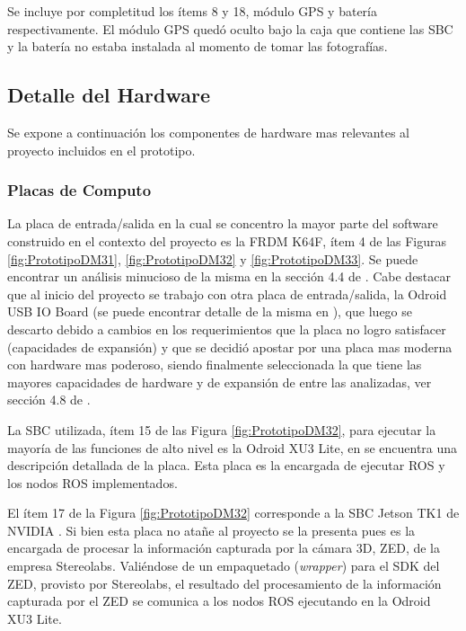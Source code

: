 \documentclass[withindex,glossary]{cam-thesis}
\begin{document}
Se incluye por completitud los ítems 8 y 18, módulo GPS y batería respectivamente. El módulo GPS quedó oculto bajo la caja que contiene las SBC y la batería no estaba instalada al momento de tomar las fotografías.

\subsection{Detalle del Hardware} \label{sec: Implementación :: Plataforma Utilizada - Hardware}
Se expone a continuación los componentes de hardware mas relevantes al proyecto incluidos en el prototipo.

\subsubsection{Placas de Computo} 
La placa de entrada/salida en la cual se concentro la mayor parte del software construido en el contexto del proyecto es la FRDM K64F, ítem 4 de las Figuras \ref{fig:PrototipoDM31}, \ref{fig:PrototipoDM32} y \ref{fig:PrototipoDM33}. Se puede encontrar un análisis minucioso de la misma en la sección 4.4 de \cite{RASSOA}. Cabe destacar que al inicio del proyecto se trabajo con otra placa de entrada/salida, la Odroid USB IO Board (se puede encontrar detalle de la misma en \cite{RASSOA}), que luego se descarto debido a cambios en los requerimientos que la placa no logro satisfacer (capacidades de expansión) y que se decidió apostar por una placa mas moderna con hardware mas poderoso, siendo finalmente seleccionada la que tiene las mayores capacidades de hardware y de expansión de entre las analizadas, ver sección 4.8 de \cite{RASSOA}.

La SBC utilizada, ítem 15 de las Figura \ref{fig:PrototipoDM32}, para ejecutar la mayoría de las funciones de alto nivel es la Odroid XU3 Lite, en \cite{ODROIDXU3} se encuentra una descripción detallada de la placa. Esta placa es la encargada de ejecutar ROS y los nodos ROS implementados.

El ítem 17 de la Figura \ref{fig:PrototipoDM32} corresponde a la SBC Jetson TK1 de NVIDIA \cite{TegraTk1}. Si bien esta placa no atañe al proyecto se la presenta pues es la encargada de procesar la información capturada por la cámara 3D, ZED, de la empresa Stereolabs. Valiéndose de un empaquetado (\textit{wrapper}) para el SDK del ZED, provisto por Stereolabs, el resultado del procesamiento de la información capturada por el ZED se comunica a los nodos ROS ejecutando en la Odroid XU3 Lite.
\end{document}
